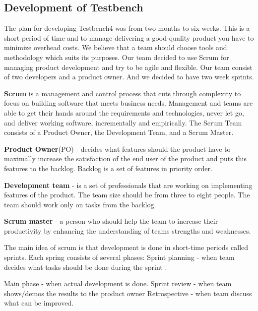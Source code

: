 \documentclass{article}
\begin{document}
   \subsection {Development of Testbench}
   	
    The plan for developing Testbench4 was from two months to six weeks. This is
    a short period of time and to manage delivering a good-quality product you
    have to minimize overhead costs. We believe that a team should choose tools
    and methodology which suits its purposes. 
    Our team decided to use Scrum for managing product development and try to be agile and flexible.
    Our team consist of two developers and a product owner. And we decided to
    have two week sprints.

    \textbf{Scrum} is a management and control process that cuts through
    complexity to focus on building software that meets business needs. Management and teams are able to get their
    hands around the requirements and technologies, never let go, and deliver working software,
    incrementally and empirically. The Scrum Team consists of a Product Owner,
    the Development Team, and a Scrum Master.
    
  \textbf{Product Owner}(PO) - decides what features should the product have to
  maximally increase the satisfaction of the end user of the product and puts this features to the backlog.
  Backlog is a set of features in priority order.
  
  \textbf{Development team} - is
  a set of professionals that are working on implementing features of the product. 
  The team size should be from three to eight people. The team should work only on tasks from the backlog.
  
  \textbf{Scrum master} - a person who should help the team to increase their
  productivity by enhancing the understanding of teams strengths and weaknesses.

  The main idea of scrum is that development is done in short-time periods
  called sprints. Each spring consists of several phases:
  Sprint planning - when team decides what tasks should be done during the
  sprint .

  Main phase - when actual development is done.
  Sprint review - when team shows/demos the results to the product owner
  Retrospective - when team discuss what can be improved.
\end{document}
